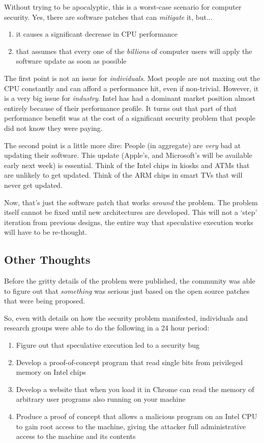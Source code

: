 \documentclass{article}
\begin{document}
Without trying to be apocalyptic, this is a worst-case scenario for computer
security. Yes, there are software patches that can \emph{mitigate} it, but...

\begin{enumerate}
  \item it causes a significant decrease in CPU performance
  \item that assumes that every one of the \emph{billions}
        of computer users will apply the software update as
        soon as possible
\end{enumerate}

The first point is not an issue for \emph{individuals}. Most people are not
maxing out the CPU constantly and can afford a performance hit, even if
non-trivial. However, it is a very big issue for \emph{industry}. Intel has had
a dominant market position almost entirely because of their performance
profile. It turns out that part of that performance benefit was at the cost of
a significant security problem that people did not know they were paying.

The second point is a little more dire: People (in aggregate) are \emph{very}
bad at updating their software. This update (Apple's, and Microsoft's will be
available early next week) is essential. Think of the Intel chips in kiosks and
ATMs that are unlikely to get updated. Think of the ARM chips in smart TVs
that will never get updated.

Now, that's just the software patch that works \emph{around} the problem. The
problem itself cannot be fixed until new architectures are developed. This will
not a `step' iteration from previous designs, the entire way that speculative
execution works will have to be re-thought.

\subsection*{Other Thoughts}

Before the gritty details of the problem were published, the community was able
to figure out that \emph{something} was serious just based on the open source
patches that were being proposed.

So, even with details on how the security problem manifested, individuals and
research groups were able to do the following in a 24 hour period:

\begin{enumerate}
  \item Figure out that speculative execution led to a security bug
  \item Develop a proof-of-concept program that read single bits from
        privileged memory on Intel chips
  \item Develop a website that when you load it in Chrome can read the
        memory of arbitrary user programs also running on your machine
  \item Produce a proof of concept that allows a malicious program on an Intel
        CPU to gain root access to the machine, giving the attacker full
        administrative access to the machine and its contents
\end{enumerate}
\end{document}
